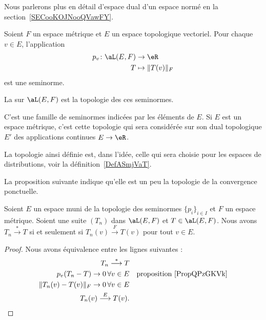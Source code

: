 Nous parlerons plus en détail d'espace dual d'un espace normé en la section~\ref{SECooKOJNooQVawFY}.

\begin{lemmaDef}  \label{DefHUelCDD}
	Soient \( F\) un espace métrique et \( E\) un espace topologique vectoriel. Pour chaque \( v\in E\), l'application
	\begin{equation}
		\begin{aligned}
			p_v\colon \aL(E,F) & \to \eR              \\
			T                  & \mapsto \| T(v) \|_F
		\end{aligned}
	\end{equation}
	est une seminorme.

	La  sur \( \aL(E,F)\) est la topologie des ces seminormes.
\end{lemmaDef}

\begin{normaltext}
	C'est une famille de seminormes indicées par les éléments de \( E\). Si \( E\) est un espace métrique, c'est cette topologie qui sera considérée sur son dual topologique \( E'\) des applications continues \( E\to \eR\).

	La topologie ainsi définie est,  dans l'idée, celle qui sera choisie pour les espaces de distributions, voir la définition~\ref{DefASmjVaT}.
\end{normaltext}

La proposition suivante indique qu'elle est un peu la topologie de la convergence ponctuelle.
\begin{proposition}     \label{PROPooQWOOooUBhBiG}
	Soient \( E\) un espace muni de la topologie des seminormes \( \{ p_i \}_{i\in I}\) et \( F\) un espace métrique. Soient une suite \( (T_n)\) dans \( \aL(E,F)\) et \( T\in \aL(E,F)\). Nous avons \( T_n\stackrel{*}{\longrightarrow}T\) si et seulement si \( T_n(v)\stackrel{F}{\longrightarrow}T(v)\) pour tout \( v\in E\).
\end{proposition}

\begin{proof}
	Nous avons équivalence entre les lignes suivantes :
	\begin{subequations}
		\begin{align}
			T_n\stackrel{*}{\longrightarrow}T                                         \\
			p_v(T_n-T)\to 0\,\forall v\in E &  & \text{proposition~\ref{PropQPzGKVk}} \\
			\| T_n(v)-T(v) \|_F\to 0\,\forall v\in E                                  \\
			T_n(v)\stackrel{E}{\longrightarrow}T(v).
		\end{align}
	\end{subequations}
\end{proof}

